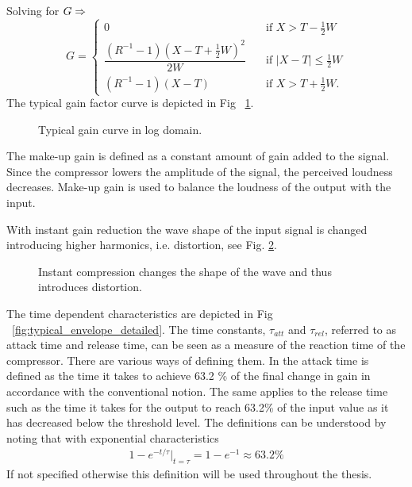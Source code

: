 \documentclass[../main2.tex]{subfiles}
\providecommand{\rootdir}{..}
\begin{document}
Solving for $G \rm \Rightarrow$
\begin{equation} \label{eq:c}
G = \begin{cases}
    0 & \quad \text{if }X >T -\frac{1}{2}W \\[0.8em]
    \dfrac{(R^{-1}-1)(X-T+\frac{1}{2}W)^2}{2W}& \quad \text{if } |X-T| \leq \frac{1}{2}W\\[1.2em]
    \left(R^{-1}-1\right)\left(X-T\right) & \quad \text{if } X > T + \frac{1}{2}W.
 \end{cases}
\end{equation}
The typical gain factor curve is depicted in Fig ~\ref{fig:typical_gain_detailed}.
\begin{figure}
\centerline{}
\caption{Typical gain curve in log domain.}
\label{fig:typical_gain_detailed}
\end{figure}

The make-up gain is defined as a constant amount of gain added to the signal. Since the compressor lowers the amplitude of the signal, the perceived loudness decreases. Make-up gain is used to balance the loudness of the output with the input.

With instant gain reduction the wave shape of the input signal is changed introducing higher harmonics, i.e. distortion, see Fig. \ref{fig:instant_comp}. 
\begin{figure}[ht]
\centering

\caption{Instant compression changes the shape of the wave and thus introduces distortion.} 
\label{fig:instant_comp}
\end{figure}
The time dependent characteristics are depicted in Fig ~\ref{fig:typical_envelope_detailed}. The time constants, $\tau_{att}$ and $\tau_{rel}$, referred to as attack time and release time, can be seen as a measure of the reaction time of the compressor. There are various ways of defining them. In \cite{mcnally1984dynamic} the attack time is defined as the time it takes to achieve 63.2 \% of the final change in gain in accordance with the conventional notion. The same applies to the release time such as the time it takes for the output to reach 63.2\% of the input value as it has decreased below the threshold level. The definitions can be understood by noting that with exponential characteristics
\begin{align}
1-e^{-t / \tau}\rvert_{t=\tau} = 1-e^{-1} \approx 63.2 \% \label{eq:time_const}
\end{align}
If not specified otherwise this definition will be used throughout the thesis.
\end{document}
